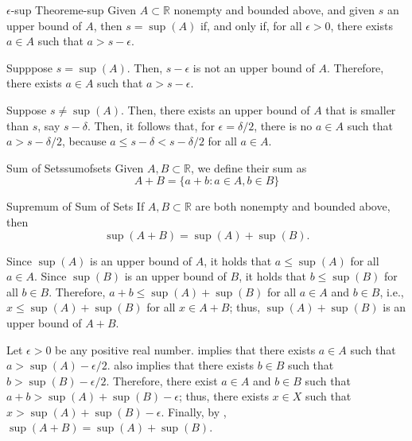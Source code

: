 
\begin{thm}{\(\epsilon\)-sup Theorem}{e-sup}
	Given \(A \subset \mathbb{R}\) nonempty and bounded above, and given \(s\) an upper bound of \(A\), then \(s = \sup(A)\) if, and only if, for all \(\epsilon > 0\), there exists \(a \in A\) such that \(a > s - \epsilon\).
\end{thm}

\begin{dem}{}{}
	Supppose \(s = \sup(A)\). Then, \(s - \epsilon\) is not an upper bound of \(A\). Therefore, there exists \(a \in A\) such that \(a > s - \epsilon\).

	Suppose \(s \neq \sup(A)\). Then, there exists an upper bound of \(A\) that is smaller than \(s\), say \(s - \delta\). Then, it follows that, for \(\epsilon = \delta / 2\), there is no \(a \in A\) such that \(a > s - \delta/2\), because  \(a \leq s - \delta < s - \delta/2\) for all \(a \in A\).
\end{dem}

\begin{defn}{Sum of Sets}{sumofsets}
	Given \(A, B \subset \mathbb{R}\), we define their sum as \[
		A + B = \{a + b : a \in A, b \in B\}
	\]
\end{defn}

\begin{thm}{Supremum of Sum of Sets}{}
	If \(A, B \subset \mathbb{R}\) are both nonempty and bounded above, then \[
		\sup(A+B) = \sup(A) + \sup(B).
	\]
\end{thm}

\begin{dem}{}{}
	Since \(\sup(A)\) is an upper bound of \(A\), it holds that \(a \leq \sup(A)\) for all \(a \in A\).
	Since \(\sup(B)\) is an upper bound of \(B\), it holds that \(b \leq \sup(B)\) for all \(b \in B\).
	Therefore, \(a + b \leq \sup(A) + \sup(B)\) for all \(a \in A\) and \(b \in B\), i.e., \(x \leq \sup(A) + \sup(B)\) for all \(x \in A + B\); thus, \(\sup(A) + \sup(B)\) is an upper bound of \(A + B\).

	Let \(\epsilon > 0\) be any positive real number.
	 implies that there exists \(a \in A\) such that \(a > \sup(A) - \epsilon/2\).
	 also implies that there exists \(b \in B\) such that \(b > \sup(B) - \epsilon/2\).
	Therefore, there exist \(a \in A\) and \(b \in B\) such that \(a + b > \sup(A) + \sup(B) - \epsilon\); thus, there exists \(x \in X\) such that \(x > \sup(A) + \sup(B) - \epsilon\).
	Finally, by , \(\sup(A+B) = \sup(A) + \sup(B)\).
\end{dem}
